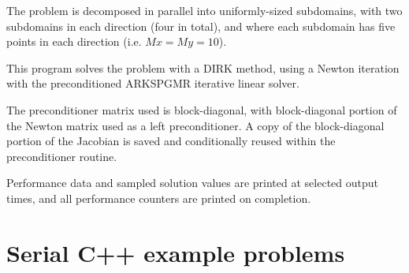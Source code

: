 \documentclass[letterpaper,10pt,english]{sphinxmanual}
\begin{document}
The problem is decomposed in parallel into uniformly-sized subdomains,
with two subdomains in each direction (four in total), and where each
subdomain has five points in each direction (i.e. \(Mx=My=10\)).

This program solves the problem with a DIRK method, using a Newton
iteration with the preconditioned ARKSPGMR iterative linear solver.

The preconditioner matrix used is block-diagonal, with block-diagonal
portion of the Newton matrix used as a left preconditioner.  A copy of
the block-diagonal portion of the Jacobian is saved and conditionally
reused within the preconditioner routine.

Performance data and sampled solution values are printed at
selected output times, and all performance counters are printed
on completion.


\chapter{Serial C++ example problems}
\label{cpp_serial:serial-cpp}\label{cpp_serial::doc}\label{cpp_serial:serial-c-example-problems}
\end{document}
